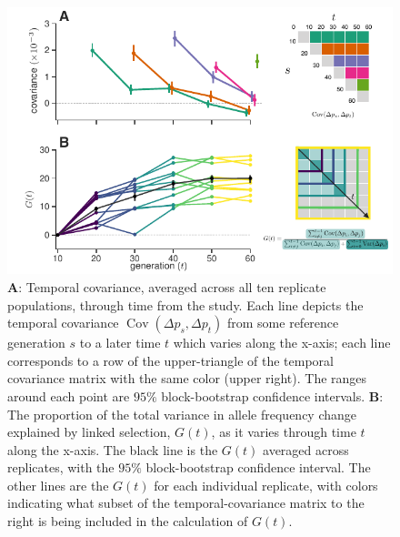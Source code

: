 \documentclass[11pt]{article}
\DeclareMathOperator{\cov}{Cov}
\providecommand{\DIFaddbeginFL}{} %
\providecommand{\DIFaddendFL}{} %
\providecommand{\DIFdelbeginFL}{} %
\providecommand{\DIFdelendFL}{} %
\begin{document}
\begin{figure}[!htb]
  \centering
  \DIFdelbeginFL %
\DIFdelendFL \DIFaddbeginFL \includegraphics[width=\textwidth]{figures/figure-1-revision.pdf}
\DIFaddendFL 

  \caption{\DIFaddbeginFL {\bf \DIFaddendFL A\DIFaddbeginFL }\DIFaddendFL : Temporal covariance, averaged across all ten replicate
    populations, through time from the \textcite{Barghi2019-qy} study. Each
    line depicts the temporal covariance $\cov(\Delta p_s, \Delta p_t)$ from
    some reference generation $s$ to a later time $t$ which varies along the
    x-axis; each line corresponds to a row of the upper-triangle of the
    temporal covariance matrix with the same color (upper right). The ranges
    around each point are $95\%$ block-bootstrap confidence intervals. \DIFaddbeginFL {\bf \DIFaddendFL B\DIFaddbeginFL }\DIFaddendFL : The
    proportion of the total variance in allele frequency change explained by
    linked selection, $G(t)$, as it varies through time $t$ along the x-axis.
    The black line is the $G(t)$ averaged across replicates, with the $95\%$
    block-bootstrap confidence interval. The other lines are the $G(t)$ for
    each individual replicate, with colors indicating what subset of the
    temporal-covariance matrix to the right is being included in the
  calculation of $G(t)$.}

  \label{fig:figure-1}
\end{figure}
\end{document}
